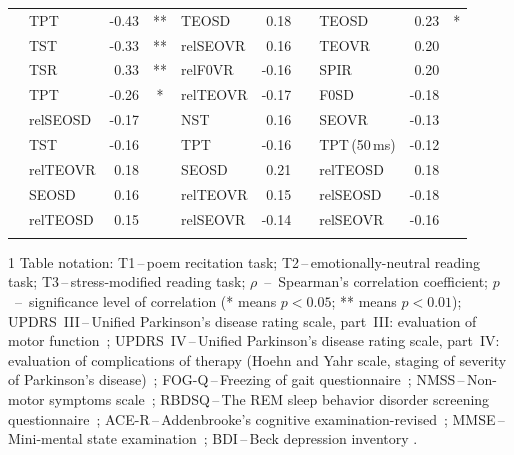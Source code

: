 \begin{table}[htb!]
\begin{threeparttable}
\begin{tabular}{l l r c l r c l r c}
			\noalign{\smallskip}
			\multirow{3}{*}{ACE-R} 
			& TPT & -0.43 & ** & TEOSD    &  0.18 &    & TEOSD &  0.23 & *  \\
			& TST & -0.33 & ** & relSEOVR &  0.16 &    & TEOVR &  0.20 &    \\
			& TSR &  0.33 & ** & relF0VR  & -0.16 &    & SPIR  &  0.20 &    \\
			
			\noalign{\smallskip}
			\multirow{3}{*}{MMSE} 
			& TPT      & -0.26 & *  & relTEOVR & -0.17 &    & F0SD          & -0.18 &    \\
			& relSEOSD & -0.17 &    & NST      &  0.16 &    & SEOVR         & -0.13 &    \\
			& TST      & -0.16 &    & TPT      & -0.16 &    & TPT\,(50\,ms) & -0.12 &    \\
			
			\noalign{\smallskip}
			\multirow{3}{*}{BDI} 
			& relTEOVR &  0.18 &    & SEOSD    &  0.21 &    & relTEOSD &  0.18 &    \\
			& SEOSD    &  0.16 &    & relTEOVR &  0.15 &    & relSEOSD & -0.18 &    \\
			& relTEOSD &  0.15 &    & relSEOVR & -0.14 &    & relSEOVR & -0.16 &    \\
			
			\noalign{\smallskip}\hline\hline
		\end{tabular}
		
		\begin{tablenotes}
			\scriptsize
			\item[1] Table notation: T1\,--\,poem recitation task; T2\,--\,emotionally-neutral reading task; T3\,--\,stress-modified reading task; $\rho$~--~Spearman's correlation coefficient; $p$~--~significance level of correlation (* means $p<0.05$; ** means $p<0.01$); UPDRS~III\,--\,Unified Parkinson's disease rating scale, part~III: evaluation of motor function~\cite{Fahn1987}; UPDRS~IV\,--\,Unified Parkinson's disease rating scale, part~IV: evaluation of complications of therapy (Hoehn and Yahr scale, staging of severity of Parkinson's disease)~\cite{Fahn1987}; FOG-Q\,--\,Freezing of gait questionnaire~\cite{Giladi2000}; NMSS\,--\,Non-motor symptoms scale~\cite{Chaudhuri2007}; RBDSQ\,--\,The REM sleep behavior disorder screening questionnaire~\cite{Stiasny2007}; ACE-R\,--\,Addenbrooke's cognitive examination-revised~\cite{Larner2007}; MMSE\,--\,Mini-mental state examination~\cite{Folstein1975}; BDI\,--\,Beck depression inventory \cite{Beck2000, Beck1961}.
		\end{tablenotes}	
	\end{threeparttable}
\end{table}

